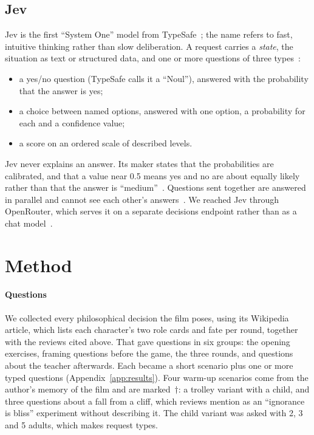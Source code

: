 \documentclass[journal]{IEEEtran}
\begin{document}
\subsection{Jev}

Jev is the first \enquote{System One} model from TypeSafe~\cite{typesafe_blog,typesafe_systemone};
the name refers to fast, intuitive thinking rather than slow deliberation. A request carries a
\emph{state}, the situation as text or structured data, and one or more questions of three
types~\cite{typesafe_quickstart,cloudflare_jev}:
\begin{itemize}[leftmargin=1.2em]
  \item a yes/no question (TypeSafe calls it a \enquote{Noul}), answered with the probability that
    the answer is yes;
  \item a choice between named options, answered with one option, a probability for each and a
    confidence value;
  \item a score on an ordered scale of described levels.
\end{itemize}
Jev never explains an answer. Its maker states that the probabilities are calibrated, and that a
value near 0.5 means yes and no are about equally likely rather than that the answer is
\enquote{medium}~\cite{typesafe_skill}. Questions sent together are answered in parallel and cannot
see each other's answers~\cite{typesafe_skill}. We reached Jev through OpenRouter, which serves it
on a separate decisions endpoint rather than as a chat model~\cite{openrouter_decisions,openrouter_model}.


\section{Method}\label{sec:method}

\paragraph{Questions} We collected every philosophical decision the film poses, using its
Wikipedia article, which lists each character's two role cards and fate per round, together with
the reviews cited above. That gave \NQuestionIds{} questions in six groups: the opening exercises,
framing questions before the game, the three rounds, and questions about the teacher afterwards.
Each became a short scenario plus one or more typed questions (Appendix~\ref{app:results}). Four
warm-up scenarios come from the author's memory of the film and are marked~$\dagger$: a trolley
variant with a child, and three questions about a fall from a cliff, which reviews mention as an
\enquote{ignorance is bliss} experiment without describing it. The child variant was asked with 2,
3 and 5 adults, which makes \NItems{} request types.
\end{document}
